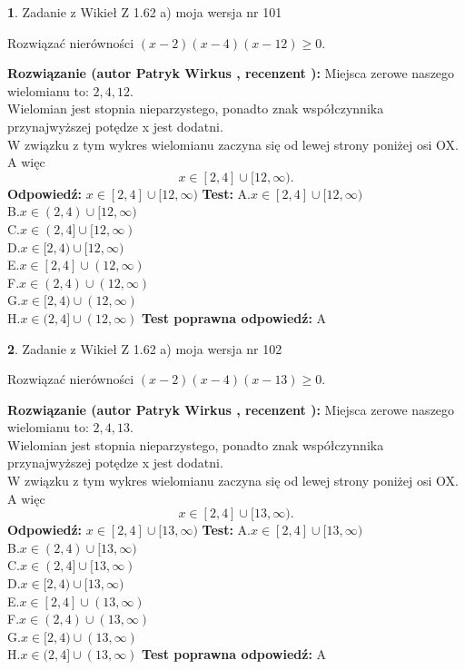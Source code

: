 \documentclass[12pt, a4paper]{article}
\theoremstyle{definition} %
\newtheorem{zad}{}
\newcommand{\zadStart}[1]{\begin{zad}#1\newline}
\newcommand{\zadStop}{\end{zad}}
\newcommand{\rozwStart}[2]{\noindent \textbf{Rozwiązanie (autor #1 , recenzent #2): }\newline}
\newcommand{\rozwStop}{\newline}
\newcommand{\odpStart}{\noindent \textbf{Odpowiedź:}\newline}
\newcommand{\odpStop}{\newline}
\newcommand{\testStart}{\noindent \textbf{Test:}\newline}
\newcommand{\testStop}{\newline}
\newcommand{\kluczStart}{\noindent \textbf{Test poprawna odpowiedź:}\newline}
\newcommand{\kluczStop}{\newline}
\begin{document}
\zadStart{Zadanie z Wikieł Z 1.62 a) moja wersja nr 101}

Rozwiązać nierówności $(x-2)(x-4)(x-12)\ge0$.
\zadStop
\rozwStart{Patryk Wirkus}{}
Miejsca zerowe naszego wielomianu to: $2, 4, 12$.\\
Wielomian jest stopnia nieparzystego, ponadto znak współczynnika przy\linebreak najwyższej potędze x jest dodatni.\\ W związku z tym wykres wielomianu zaczyna się od lewej strony poniżej osi OX. A więc $$x \in [2,4] \cup [12,\infty).$$
\rozwStop
\odpStart
$x \in [2,4] \cup [12,\infty)$
\odpStop
\testStart
A.$x \in [2,4] \cup [12,\infty)$\\
B.$x \in (2,4) \cup [12,\infty)$\\
C.$x \in (2,4] \cup [12,\infty)$\\
D.$x \in [2,4) \cup [12,\infty)$\\
E.$x \in [2,4] \cup (12,\infty)$\\
F.$x \in (2,4) \cup (12,\infty)$\\
G.$x \in [2,4) \cup (12,\infty)$\\
H.$x \in (2,4] \cup (12,\infty)$
\testStop
\kluczStart
A
\kluczStop



\zadStart{Zadanie z Wikieł Z 1.62 a) moja wersja nr 102}

Rozwiązać nierówności $(x-2)(x-4)(x-13)\ge0$.
\zadStop
\rozwStart{Patryk Wirkus}{}
Miejsca zerowe naszego wielomianu to: $2, 4, 13$.\\
Wielomian jest stopnia nieparzystego, ponadto znak współczynnika przy\linebreak najwyższej potędze x jest dodatni.\\ W związku z tym wykres wielomianu zaczyna się od lewej strony poniżej osi OX. A więc $$x \in [2,4] \cup [13,\infty).$$
\rozwStop
\odpStart
$x \in [2,4] \cup [13,\infty)$
\odpStop
\testStart
A.$x \in [2,4] \cup [13,\infty)$\\
B.$x \in (2,4) \cup [13,\infty)$\\
C.$x \in (2,4] \cup [13,\infty)$\\
D.$x \in [2,4) \cup [13,\infty)$\\
E.$x \in [2,4] \cup (13,\infty)$\\
F.$x \in (2,4) \cup (13,\infty)$\\
G.$x \in [2,4) \cup (13,\infty)$\\
H.$x \in (2,4] \cup (13,\infty)$
\testStop
\kluczStart
A
\kluczStop
\end{document}
